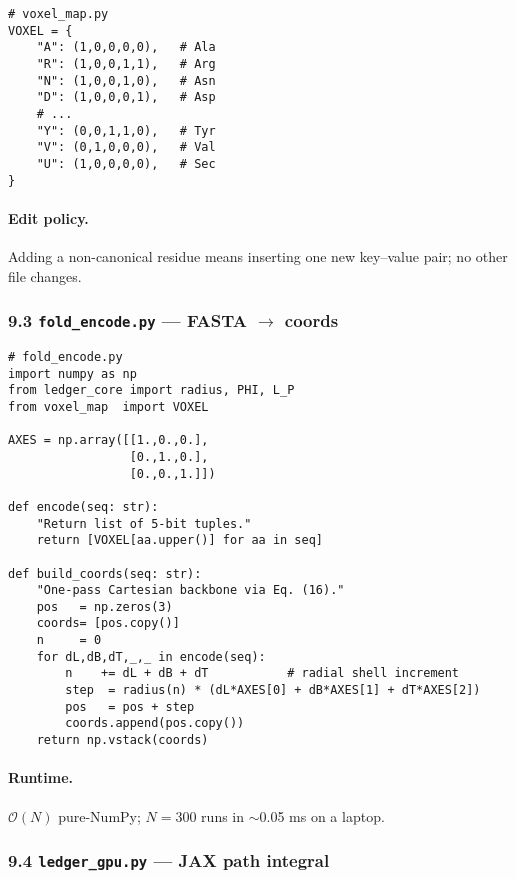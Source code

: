 \documentclass[11pt]{article}
\begin{document}
\begin{verbatim}
# voxel_map.py
VOXEL = {
    "A": (1,0,0,0,0),   # Ala
    "R": (1,0,0,1,1),   # Arg
    "N": (1,0,0,1,0),   # Asn
    "D": (1,0,0,0,1),   # Asp
    # ...
    "Y": (0,0,1,1,0),   # Tyr
    "V": (0,1,0,0,0),   # Val
    "U": (1,0,0,0,0),   # Sec
}
\end{verbatim}

\paragraph{Edit policy.}  
Adding a non-canonical residue means inserting one new key–value pair;
no other file changes.

\subsubsection*{9.3  \texttt{fold\_encode.py} — FASTA $\to$ coords}

\begin{verbatim}
# fold_encode.py
import numpy as np
from ledger_core import radius, PHI, L_P
from voxel_map  import VOXEL

AXES = np.array([[1.,0.,0.],
                 [0.,1.,0.],
                 [0.,0.,1.]])

def encode(seq: str):
    "Return list of 5-bit tuples."
    return [VOXEL[aa.upper()] for aa in seq]

def build_coords(seq: str):
    "One-pass Cartesian backbone via Eq. (16)."
    pos   = np.zeros(3)
    coords= [pos.copy()]
    n     = 0
    for dL,dB,dT,_,_ in encode(seq):
        n    += dL + dB + dT           # radial shell increment
        step  = radius(n) * (dL*AXES[0] + dB*AXES[1] + dT*AXES[2])
        pos   = pos + step
        coords.append(pos.copy())
    return np.vstack(coords)
\end{verbatim}

\paragraph{Runtime.}  
\(\mathcal O(N)\) pure-NumPy; $N=300$ runs in $\sim$0.05 ms on a laptop.

\subsubsection*{9.4  \texttt{ledger\_gpu.py} — JAX path integral}
\end{document}
